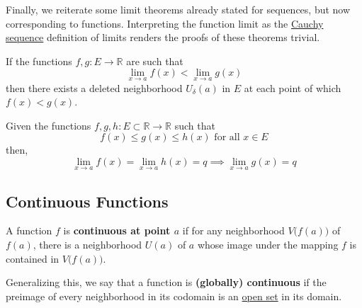   Finally, we reiterate some limit theorems already stated for sequences, but now corresponding to functions. Interpreting the function limit as the \hyperref[def:cauchy-sequence]{Cauchy sequence} definition of limits renders the proofs of these theorems trivial. 

  \begin{theorem}
    \label{thm:bounds-on-limits-of-functions}
    If the functions $f, g: E \to \mathbb{R}$ are such that
    \begin{equation}
      \lim_{x\to a} f(x) < \lim_{x \to a} g(x)
    \end{equation}
    then there exists a deleted neighborhood $U_\delta (a)$ in $E$ at each point of which $f(x) < g(x)$. 
  \end{theorem}

  \begin{theorem}
    \label{thm:squeeze-theorem-for-limits-of-functions}
    Given the functions $f, g, h: E \subset \mathbb{R} \to \mathbb{R}$ such that
    \begin{equation}
      f(x) \leq g(x) \leq h(x) \text{ for all } x \in E
    \end{equation}
    then, 
    \begin{equation}
      \lim_{x \to a} f(x) = \lim_{x \to a} h(x) = q \implies \lim_{x \to a} g(x) = q
    \end{equation}
  \end{theorem}

\subsection{Continuous Functions}

  \begin{definition}
    \label{def:continuity-of-a-function}
    A function $f$ is \textbf{continuous at point $a$} if for any neighborhood $V\big(f(a)\big)$ of $f(a)$, there is a neighborhood $U(a)$ of $a$ whose image under the mapping $f$ is contained in $V\big( f(a)\big)$. 

    Generalizing this, we say that a function is \textbf{(globally) continuous} if the preimage of every neighborhood in its codomain is an \hyperref[pst-def:open-set]{open set} in its domain. 
  \end{definition}

